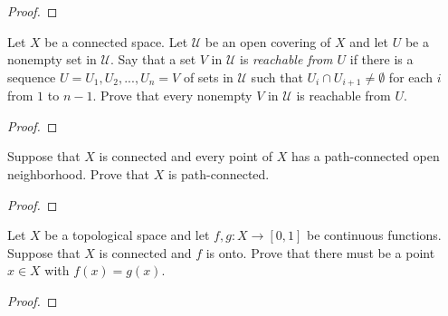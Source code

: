 \begin{proof}
\end{proof}
\begin{problem}
Let $X$ be a connected space. Let $\mathcal{U}$ be an open
covering of $X$ and let $U$ be a nonempty set in
$\mathcal{U}$. Say that a set $V$ in $\mathcal{U}$ is
\emph{reachable from $U$} if there is a sequence
$U=U_1,U_2,...,U_n=V$ of sets in $\mathcal{U}$ such that $U_i\cap
U_{i+1}\neq\emptyset$ for each $i$ from $1$ to $n-1$. Prove that
every nonempty $V$ in $\mathcal{U}$ is reachable from $U$.
\end{problem}
\begin{proof}
\end{proof}
\begin{problem}
Suppose that $X$ is connected and every point of $X$ has a
path-connected open neighborhood. Prove that $X$ is
path-connected.
\end{problem}
\begin{proof}
\end{proof}
\begin{problem}
Let $X$ be a topological space and let $f,g\colon X\to[0,1]$ be
continuous functions. Suppose that $X$ is connected and $f$ is
onto. Prove that there must be a point $x\in X$ with
$f(x)=g(x)$.
\end{problem}
\begin{proof}
\end{proof}

